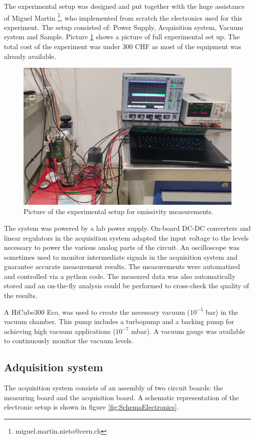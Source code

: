 The experimental setup was designed and put together with the huge assistance of Miguel Martin \footnote{miguel.martin.nieto@cern.ch}, who implemented from scratch the electronics used for this experiment. The setup consisted of: Power Supply, Acquisition system, Vacuum system and Sample. Picture \ref{fig:ExperimentalSetUp} shows a picture of full experimental set up. The total cost of the experiment was under 300 CHF as most of the equipment was already available. 

\begin{figure}[h]
    \centering
    \includegraphics[width=0.65\columnwidth]{ExperimentalSetUp/ExperimentalSetUp.jpg}
    \caption{Picture of the experimental setup for emissivity measurements.}
    \label{fig:ExperimentalSetUp}
\end{figure}

The system was powered by a lab power supply. On-board DC-DC converters and linear regulators in the acquisition system adapted the input voltage to the levels necessary to power the various analog parts of the circuit. An oscilloscope was sometimes used to monitor intermediate signals in the acquisition system and guarantee accurate measurement results. The measurements were automatized and controlled via a python code. The measured data was also automatically stored and an on-the-fly analysis could be performed to cross-check the quality of the results. 

A HiCube300 Eco, was used to create the necessary vacuum ($10^{-5}$ bar) in the vacuum chamber. This pump includes a turbopump and a backing pump for achieving high vacuum applications ($10^{-7}$ mbar). A vacuum gauge was available to continuously monitor the vacuum levels. 

\subsection{Adquisition system}

The acquisition system consists of an assembly of two circuit boards: the measuring board and the acquisition board. A schematic representation of the electronic setup is shown in figure \ref{fig:SchemaElectronics}. 


